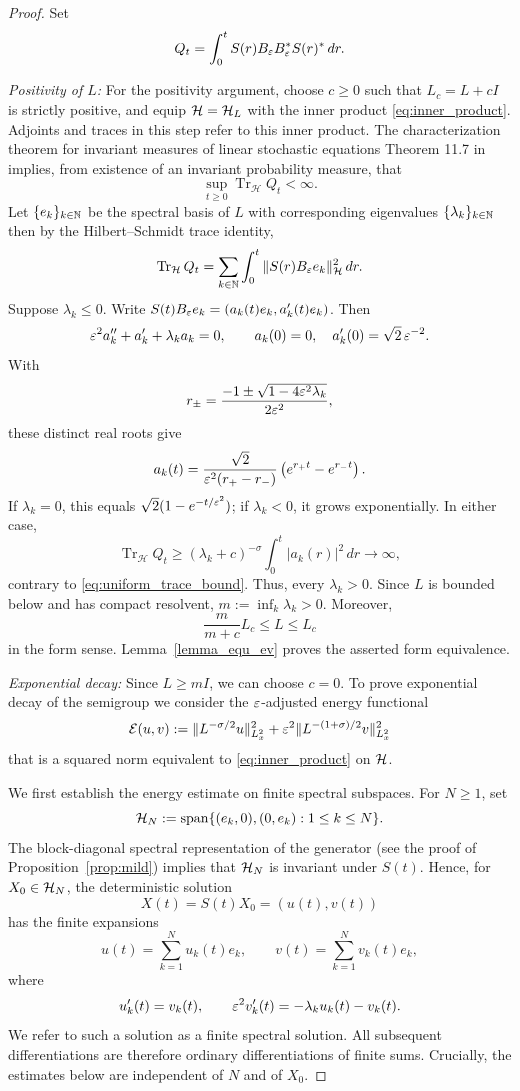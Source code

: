 \begin{proof}
Set
\[
 Q_t=\int_0^t S(r)B_\varepsilon B_\varepsilon^*S(r)^*\,dr.
\]

\emph{Positivity of \(L\):}
For the positivity argument, choose $c\geq0$ such that
$L_c=L+cI$ is strictly positive, and equip $\mathcal{H}=\mathcal{H}_L$
with the inner product \eqref{eq:inner_product}.
Adjoints and traces in this step refer to this inner product.
The characterization theorem for invariant measures of linear
stochastic equations Theorem 11.7 in \cite{DaPrato_Zabczyk_2014}
implies, from existence of an invariant probability measure, that
\begin{equation}\label{eq:uniform_trace_bound}
 \sup_{t\geq0}\operatorname{Tr}_{\mathcal H} Q_t<\infty.
\end{equation}
Let $\{e_k\}_{k \in \mathbb{N}}$ be the spectral basis of $L$ with corresponding eigenvalues $\{\lambda_k\}_{k \in \mathbb{N}}$ then by the Hilbert--Schmidt trace identity,
\[
 \operatorname{Tr}_{\mathcal H} Q_t
   =\sum_{k\in\mathbb{N}}\int_0^t\|S(r)B_\varepsilon e_k\|_{\mathcal H}^2\,dr.
\]
Suppose \(\lambda_k\leq0\). Write
\(S(t)B_\varepsilon e_k=(a_k(t)e_k,a_k'(t)e_k)\). Then
\[
 \varepsilon^2a_k''+a_k'+\lambda_ka_k=0,\qquad
 a_k(0)=0,\quad a_k'(0)=\sqrt2\,\varepsilon^{-2}.
\]
With
\[
 r_\pm=\frac{-1\pm\sqrt{1-4\varepsilon^2\lambda_k}}{2\varepsilon^2},
\]
these distinct real roots give
\[
 a_k(t)=\frac{\sqrt2}{\varepsilon^2(r_+-r_-)}
              \left(e^{r_+t}-e^{r_-t}\right).
\]
If \(\lambda_k=0\), this equals
\(\sqrt2(1-e^{-t/\varepsilon^2})\); if \(\lambda_k<0\), it grows
exponentially. In either case,
\[
 \operatorname{Tr}_{\mathcal{H}} Q_t
 \geq (\lambda_k + c)^{-\sigma}\int_0^t|a_k(r)|^2\,dr
 \longrightarrow\infty,
\]
contrary to \eqref{eq:uniform_trace_bound}.
Thus, every \(\lambda_k>0\). Since \(L\) is bounded below and has
compact resolvent, \(m:=\inf_k\lambda_k>0\).
Moreover,
\[
 \frac{m}{m+c}L_c\leq L\leq L_c
\]
in the form sense. Lemma~\ref{lemma_equ_ev} proves the asserted
form equivalence.

\emph{Exponential decay:}
Since $L\geq mI$, we can choose $c=0$. 
To prove exponential decay of the semigroup we consider the $\varepsilon$-adjusted energy functional
\[
 \mathcal E(u,v)
   :=\|L^{-\sigma/2}u\|_{L^2_x}^2
        +\varepsilon^2\|L^{-(1+\sigma)/2}v\|_{L^2_x}^2
\]
that is a squared norm equivalent to \eqref{eq:inner_product} on $\mathcal{H}$. 

We first establish the energy estimate on finite spectral
subspaces. For $N\geq1$, set
\[
 \mathcal{H}_N:=\operatorname{span}\{(e_k,0),(0,e_k):1\leq k\leq N\}.
\]
The block-diagonal spectral representation of the generator (see the proof of Proposition~\ref{prop:mild})
implies that $\mathcal{H}_N$ is invariant under $S(t)$. Hence, for
$X_0\in \mathcal{H}_N$, the deterministic solution
\[
 X(t)=S(t)X_0=(u(t),v(t))
\]
has the finite expansions
\[
 u(t)=\sum_{k=1}^N u_k(t)e_k,
 \qquad
 v(t)=\sum_{k=1}^N v_k(t)e_k,
\]
where
\[
 u_k'(t)=v_k(t),\qquad
 \varepsilon^2v_k'(t)=-\lambda_k u_k(t)-v_k(t).
\]
We refer to such a solution as a finite spectral solution.
All subsequent differentiations are therefore ordinary
differentiations of finite sums. Crucially, the estimates
below are independent of $N$ and of $X_0$.


\end{proof}
